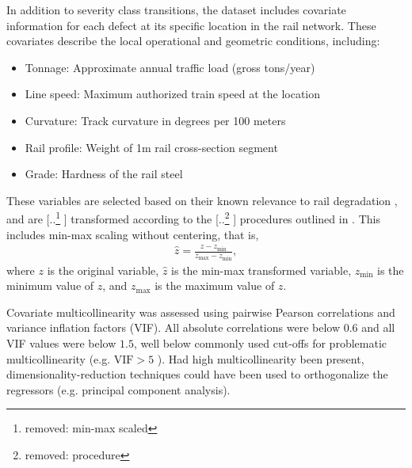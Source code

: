 \documentclass{article}
\providecommand{\DIFadd}[1]{{\protect\color{blue} \sf #1}} %
\providecommand{\DIFdel}[1]{{\protect\color{red} [..\footnote{removed: #1} ]}} %
\providecommand{\DIFaddbegin}{} %
\providecommand{\DIFaddend}{} %
\providecommand{\DIFdelbegin}{} %
\providecommand{\DIFdelend}{} %
\begin{document}
In addition to severity class transitions, the dataset includes covariate information for each defect at its specific location in the rail network. These covariates describe the local operational and geometric conditions, including:

\begin{itemize}
    \item Tonnage: Approximate annual traffic load (gross tons/year)
    \item Line speed: Maximum authorized train speed at the location
    \item Curvature: Track curvature in degrees per 100 meters
    \item Rail profile: Weight of 1m rail cross-section segment
    \item Grade: Hardness of the rail steel
\end{itemize}

These variables are selected based on their known relevance to rail degradation \citep{ghofrani2019a,dick2003a,UIC_2002_defecthandbook,RASMUSSEN20178}, and are \DIFdelbegin \DIFdel{min-max scaled }\DIFdelend \DIFaddbegin \DIFadd{transformed }\DIFaddend according to the \DIFdelbegin \DIFdel{procedure }\DIFdelend \DIFaddbegin \DIFadd{procedures }\DIFaddend outlined in \citet{bisgaard2024A}. \DIFaddbegin \DIFadd{This includes min-max scaling without centering, that is,
}\begin{align*}
    \widehat{z} = \frac{z - z_{\text{min}}}{z_{\text{max}} - z_{\text{min}}},
\end{align*}
\DIFadd{where $z$ is the original variable, $\widehat{z}$ is the min-max transformed variable, $z_{\text{min}}$ is the minimum value of $z$, and $z_{\text{max}}$ is the maximum value of $z$. 
}\DIFaddend 

\DIFaddbegin \DIFadd{Covariate multicollinearity was assessed using pairwise Pearson correlations and variance inflation factors (VIF). All absolute correlations were below $0.6$ and all VIF values were below $1.5$, well below commonly used cut-offs for problematic multicollinearity (e.g. $\text{VIF} > 5$ \citep[Sec. 6.4.1]{sheather2009a}).
Had high multicollinearity been present, dimensionality-reduction techniques could have been used to orthogonalize the regressors (e.g. principal component analysis).
}
\end{document}
